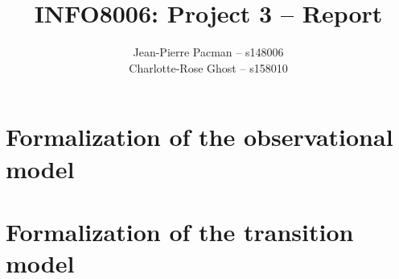 \documentclass{article}
\title{\Large{INFO8006: Project 3 -- Report}}
\author{Jean-Pierre Pacman -- s148006\\Charlotte-Rose Ghost -- s158010}
\begin{document}
\maketitle

\section{Formalization of the observational model}

\section{Formalization of the transition model}
\end{document}
